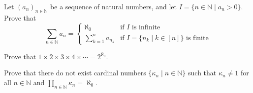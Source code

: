 \begin{exercise}
Let $(a_n)_{n \in \mathbb{N}}$ be a sequence of natural numbers, and let $I = \{ n \in \mathbb{N} \mid a_n > 0 \}$. Prove that
\[ \sum_{n \in \mathbb{N}} a_n = \begin{cases} \aleph_0 & \text{if $I$ is infinite} \\ \sum_{k=1}^n a_{n_k} & \text{if $I = \{ n_k \mid k \in [n] \}$ is finite} \end{cases} \]
\end{exercise}

\begin{exercise}
Prove that $1 \times 2 \times 3 \times 4 \times \cdots = 2^{\aleph_0}$.
\end{exercise}

\begin{exercise}
Prove that there do not exist cardinal numbers $\{ \kappa_n \mid n \in \mathbb{N} \}$ such that $\kappa_n \ne 1$ for all $n \in \mathbb{N}$ and $\displaystyle \prod_{n \in \mathbb{N}} \kappa_n = \aleph_0$.
\end{exercise}